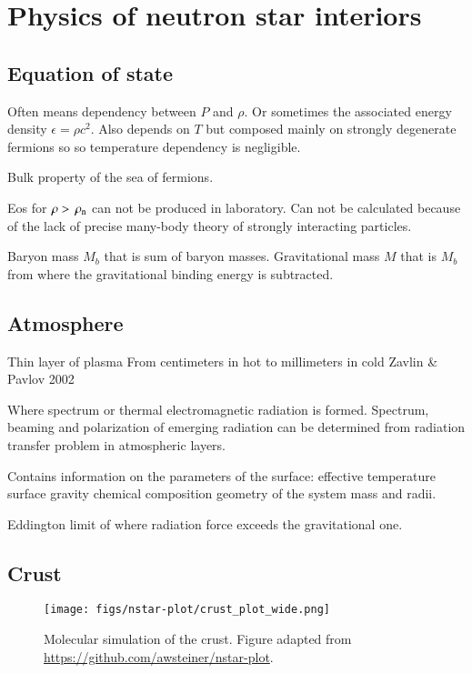 \chapter{Physics of neutron star interiors} 



\section{Equation of state}

Often means dependency between $P$ and $\rho$. 
Or sometimes the associated energy density $\epsilon = \rho c^2$.
Also depends on $T$ but composed mainly on strongly degenerate fermions so so temperature dependency is negligible.

Bulk property of the sea of fermions.

Eos for $\rho > \, \rho_{\mathrm{n}} $ can not be produced in laboratory.
Can not be calculated because of the lack of precise many-body theory of strongly interacting particles.


Baryon mass $M_b$ that is sum of baryon masses.
Gravitational mass $M$ that is $M_b$ from where the gravitational binding energy is subtracted. \cite{Zwicky38}


\section{Atmosphere}
Thin layer of plasma
From centimeters in hot to millimeters in cold 
Zavlin \& Pavlov 2002

Where spectrum or thermal electromagnetic radiation is formed.
Spectrum, beaming and polarization of emerging radiation can be determined from radiation transfer problem in atmospheric layers.

Contains information on the parameters of the surface:
effective temperature
surface gravity
chemical composition
geometry of the system
mass and radii.


Eddington limit of where radiation force exceeds the gravitational one.


\section{Crust}

\begin{figure}
\centering
\texttt{[image: figs/nstar-plot/crust\_plot\_wide.png]}
\caption{\label{fig:crust}
Molecular simulation of the crust.
Figure adapted from \url{https://github.com/awsteiner/nstar-plot}.
}
\end{figure}

